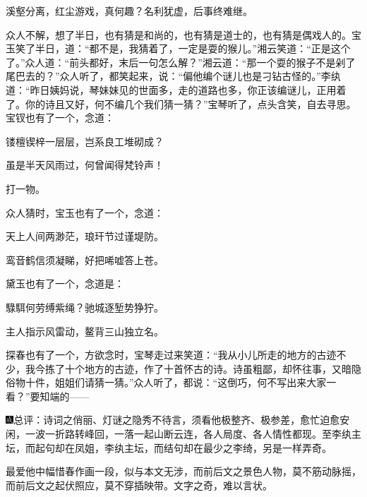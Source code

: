 溪壑分离，红尘游戏，真何趣？名利犹虚，后事终难继。

众人不解，想了半日，也有猜是和尚的，也有猜是道士的，也有猜是偶戏人的。宝玉笑了半日，道：``都不是，我猜着了，一定是耍的猴儿。''湘云笑道：``正是这个了。''众人道：``前头都好，末后一句怎么解？''湘云道：``那一个耍的猴子不是剁了尾巴去的？''众人听了，都笑起来，说：``偏他编个谜儿也是刁钻古怪的。''李纨道：``昨日姨妈说，琴妹妹见的世面多，走的道路也多，你正该编谜儿，正用着了。你的诗且又好，何不编几个我们猜一猜？''宝琴听了，点头含笑，自去寻思。宝钗也有了一个，念道：

镂檀锲梓一层层，岂系良工堆砌成？

虽是半天风雨过，何曾闻得梵铃声！

打一物。

众人猜时，宝玉也有了一个，念道：

天上人间两渺茫，琅玕节过谨堤防。

鸾音鹤信须凝睇，好把唏嘘答上苍。

黛玉也有了一个，念道是：

騄駬何劳缚紫绳？驰城逐堑势狰狞。

主人指示风雷动，鳌背三山独立名。

探春也有了一个，方欲念时，宝琴走过来笑道：``我从小儿所走的地方的古迹不少，我今拣了十个地方的古迹，作了十首怀古的诗。诗虽粗鄙，却怀往事，又暗隐俗物十件，姐姐们请猜一猜。''众人听了，都说：``这倒巧，何不写出来大家一看？''要知端的------

{\includegraphics[width=3mm]{../Images/00005}总评：诗词之俏丽、灯谜之隐秀不待言，须看他极整齐、极参差，愈忙迫愈安闲，一波一折路转峰回，一落一起山断云连，各人局度、各人情性都现。至李纨主坛，而起句却在凤姐，李纨主坛，而结句却在最少之李绮，另是一样弄奇。}

{最爱他中幅惜春作画一段，似与本文无涉，而前后文之景色人物，莫不筋动脉摇，而前后文之起伏照应，莫不穿插映带。文字之奇，难以言状。}
